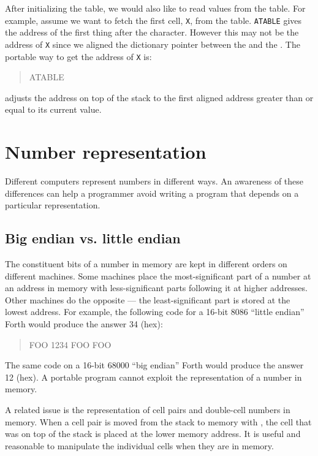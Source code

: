 After initializing the table, we would also like to read values from
the table. For example, assume we want to fetch the first cell,
\texttt{X}, from the table. \texttt{ATABLE}  gives the
address of the first thing after the character. However this may not
be the address of \texttt{X} since we aligned the dictionary pointer
between the  and the \word{,}. The portable way to get the
address of \texttt{X} is:
\begin{quote}\ttfamily
	ATABLE  
\end{quote}
 adjusts the address on top of the stack to the first
aligned address greater than or equal to its current value.


\section{Number representation} %

Different computers represent numbers in different ways. An awareness
of these differences can help a programmer avoid writing a program
that depends on a particular representation.

\subsection{Big endian vs. little endian} %

The constituent bits of a number in memory are kept in different
orders on different machines. Some machines place the most-significant
part of a number at an address in memory with less-significant parts
following it at higher addresses. Other machines do the opposite ---
the least-significant part is stored at the lowest address. For
example, the following code for a 16-bit 8086 ``little endian'' Forth
would produce the answer 34 (hex):
\begin{quote}\ttfamily
	 FOO
	\quad {} 1234 FOO \word{!}
	\quad FOO 
\end{quote}
The same code on a 16-bit 68000 ``big endian'' Forth would produce the
answer 12 (hex). A portable program cannot exploit the representation
of a number in memory.

A related issue is the representation of cell pairs and double-cell
numbers in memory. When a cell pair is moved from the stack to memory
with , the cell that was on top of the stack is placed at the
lower memory address. It is useful and reasonable to manipulate the
individual cells when they are in memory.

